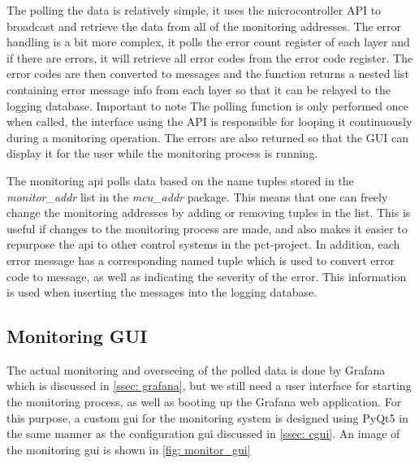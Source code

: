 \documentclass[main.tex]{subfiles}
\begin{document}
The polling the data is relatively simple, it uses the microcontroller API to broadcast and retrieve the data from all of the monitoring addresses. The error handling is a bit more complex, it polls the error count register of each layer and if there are errors, it will retrieve all error codes from the error code register. The error codes are then converted to messages and the function returns a nested list containing error message info from each layer so that it can be relayed to the logging database. Important to note The polling function is only performed once when called, the interface using the API is responsible for looping it continuously during a monitoring operation. The errors are also returned so that the GUI can display it for the user while the monitoring process is running.

The monitoring \gls{api} polls data based on the name tuples stored in the \textit{monitor\_addr} list in the \textit{mcu\_addr} package. This means that one can freely change the monitoring addresses by adding or removing tuples in the list. This is useful if changes to the monitoring process are made, and also makes it easier to repurpose the \gls{api} to other control systems in the \gls{pct}-project. In addition, each error message has a corresponding named tuple which is used to convert error code to message, as well as indicating the severity of the error. This information is used when inserting the messages into the logging database.


\subsection{Monitoring GUI}

The actual monitoring and overseeing of the polled data is done by Grafana which is discussed in \autoref{ssec: grafana}, but we still need a user interface for starting the monitoring process, as well as booting up the Grafana web application. For this purpose, a custom \gls{gui} for the monitoring system is designed using PyQt5 in the same manner as the configuration \gls{gui} discussed in \autoref{ssec: cgui}. An image of the monitoring \gls{gui} is shown in \autoref{fig: monitor_gui}
\end{document}
